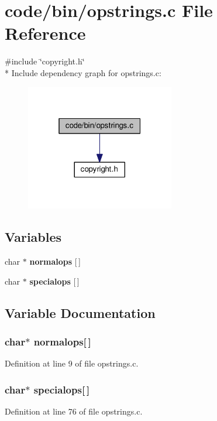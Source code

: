 \section{code/bin/opstrings.c File Reference}
\label{opstrings_8c}
{\ttfamily \#include \char`\"{}copyright.\+h\char`\"{}}\\*
Include dependency graph for opstrings.\+c\+:
\nopagebreak
\begin{figure}[H]
\begin{center}
\leavevmode
\includegraphics[width=184pt]{opstrings_8c__incl}
\end{center}
\end{figure}
\subsection*{Variables}
\begin{DoxyCompactItemize}
\item 
char $\ast$ {\bf normalops} [$\,$]
\item 
char $\ast$ {\bf specialops} [$\,$]
\end{DoxyCompactItemize}


\subsection{Variable Documentation}
\subsubsection[{normalops}]{\setlength{\rightskip}{0pt plus 5cm}char$\ast$ normalops[$\,$]}\label{opstrings_8c_ab58f246552f6174dfbdbc39d3a9bd1e9}


Definition at line 9 of file opstrings.\+c.

\subsubsection[{specialops}]{\setlength{\rightskip}{0pt plus 5cm}char$\ast$ specialops[$\,$]}\label{opstrings_8c_a73dba50fdeba637988dba6aba3b75509}


Definition at line 76 of file opstrings.\+c.

